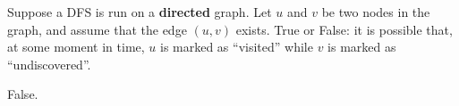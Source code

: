 \begin{prob}
    Suppose a DFS is run on a \textbf{directed} graph. Let $u$ and $v$ be two
    nodes in the graph, and assume that the edge $(u, v)$ exists. True or
    False: it is possible that, at some moment in time, $u$ is marked as
    ``visited'' while $v$ is marked as ``undiscovered''.

    \tF{}

    \begin{soln}
        False.
    \end{soln}

\end{prob}
